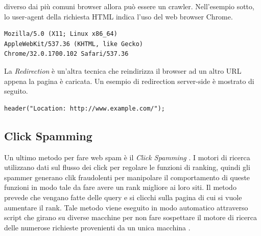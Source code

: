 diverso dai 
più comuni browser allora può essere un crawler. Nell'esempio sotto, lo user-agent della richiesta HTML indica l'uso del web browser Chrome.
\begin{lstlisting}[frame=trbl,postbreak=\space, breakindent=5pt, breaklines]
Mozilla/5.0 (X11; Linux x86_64) 
AppleWebKit/537.36 (KHTML, like Gecko) 
Chrome/32.0.1700.102 Safari/537.36
\end{lstlisting}
La \textit{Redirection} è un'altra tecnica che reindirizza il browser ad un altro URL appena la pagina è caricata. Un esempio di redirection server-side è mostrato di seguito.
\begin{lstlisting}[frame=trbl,postbreak=\space, breakindent=5pt, breaklines]
header("Location: http://www.example.com/");
\end{lstlisting}
\subsection{Click Spamming}
Un ultimo metodo per fare web spam è il \textit{Click Spamming} \cite{Spirin:2012:SWS:2207243.2207252}. I motori di ricerca utilizzano dati sul flusso dei click per regolare le funzioni di ranking, quindi  gli spammer generano clik fraudolenti per manipolare il comportamento di queste funzioni in modo tale da fare avere un rank migliore ai loro siti. Il metodo prevede che vengano fatte delle query e si clicchi sulla pagina di cui si vuole aumentare il rank. Tale metodo viene eseguito in modo automatico attraverso script che girano su diverse macchine per non fare sospettare il motore di ricerca delle numerose richieste provenienti da un unica macchina \cite{Spirin:2012:SWS:2207243.2207252}.


